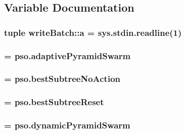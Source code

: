 \subsection{Variable Documentation}
\hypertarget{namespacewriteBatch_c2c17fe84bec49456afa091013ebcc31}{
\subsubsection{\setlength{\rightskip}{0pt plus 5cm}tuple {\bf writeBatch::a} = sys.stdin.readline(1)}}
\label{namespacewriteBatch_c2c17fe84bec49456afa091013ebcc31}


\hypertarget{namespacewriteBatch_e18b9d53c68a25d13173a7a5b2d89806}{
\subsubsection{ = {\bf pso.adaptivePyramidSwarm}}}
\label{namespacewriteBatch_e18b9d53c68a25d13173a7a5b2d89806}


\hypertarget{namespacewriteBatch_3903ca5cd3f94b2f41abb3d27ec8f508}{
\subsubsection{ = {\bf pso.bestSubtreeNoAction}}}
\label{namespacewriteBatch_3903ca5cd3f94b2f41abb3d27ec8f508}


\hypertarget{namespacewriteBatch_3b9f2d6ffe2bbdf3f80166c39f82773c}{
\subsubsection{ = {\bf pso.bestSubtreeReset}}}
\label{namespacewriteBatch_3b9f2d6ffe2bbdf3f80166c39f82773c}


\hypertarget{namespacewriteBatch_b4f9d2747f950e8ee069341ecd613cec}{
\subsubsection{ = {\bf pso.dynamicPyramidSwarm}}}
\label{namespacewriteBatch_b4f9d2747f950e8ee069341ecd613cec}


